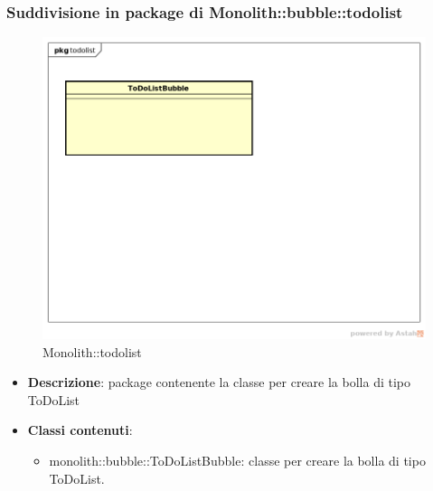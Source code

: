 \subsubsection{Suddivisione in package  di Monolith::bubble::todolist}
\label{Monolith::bubble::todolist}
\begin{figure}[H]
	\centering
	\includegraphics[scale=0.5]{Sezioni/imgPackage/bubble_todolist.png}
	\caption{Monolith::todolist}
\end{figure}
\begin{itemize}
	\item{\textbf{Descrizione}}: package contenente la classe per creare la bolla di tipo ToDoList
	\item{\textbf{Classi contenuti}}:
	\begin{itemize}
	\item{monolith::bubble::ToDoListBubble}: classe per creare la bolla di tipo ToDoList.
	\end{itemize}
\end{itemize}

